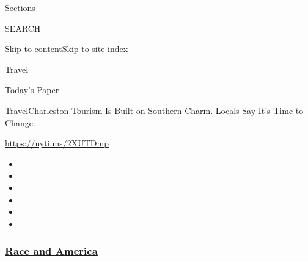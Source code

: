 Sections

SEARCH

\protect\hyperlink{site-content}{Skip to
content}\protect\hyperlink{site-index}{Skip to site index}

\href{https://www.nytimes3xbfgragh.onion/section/travel}{Travel}

\href{https://myaccount.nytimes3xbfgragh.onion/auth/login?response_type=cookie\&client_id=vi}{}

\href{https://www.nytimes3xbfgragh.onion/section/todayspaper}{Today's
Paper}

\href{/section/travel}{Travel}\textbar{}Charleston Tourism Is Built on
Southern Charm. Locals Say It's Time to Change.

\url{https://nyti.ms/2XUTDmp}

\begin{itemize}
\item
\item
\item
\item
\item
\item
\end{itemize}

\hypertarget{race-and-america}{%
\subsubsection{\texorpdfstring{\href{https://www.nytimes3xbfgragh.onion/news-event/george-floyd-protests-minneapolis-new-york-los-angeles?name=styln-george-floyd\&region=TOP_BANNER\&block=storyline_menu_recirc\&action=click\&pgtype=Article\&impression_id=99e870a0-f1c5-11ea-b574-81c26c4f5aee\&variant=undefined}{Race
and America}}{Race and America}}\label{race-and-america}}

